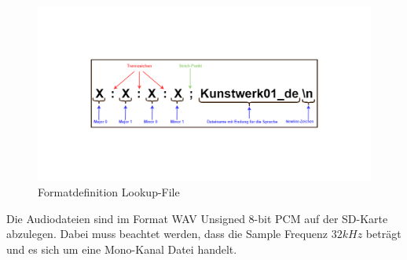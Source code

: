 \begin{figure}[H]
	\begin{center}
		\includegraphics[width=140mm]{data/Definition_picture.png}
		\caption[Formatdefinition Lookup-File]{Formatdefinition Lookup-File} %
		\label{fig:definition_lookup_file}
	\end{center}
\end{figure}

Die Audiodateien sind im Format WAV Unsigned 8-bit PCM auf der SD-Karte abzulegen. Dabei muss beachtet werden, dass die Sample Frequenz $32 kHz$ beträgt und es sich um eine Mono-Kanal Datei handelt. 
